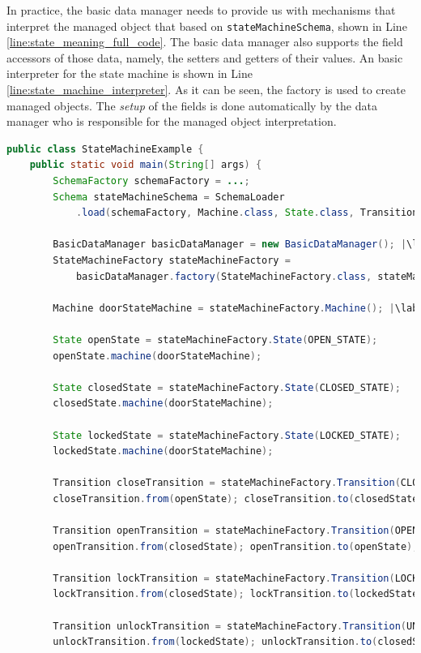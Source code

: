 In practice, the basic data manager needs to provide us with mechanisms that interpret the managed object that based on \texttt{stateMachineSchema}, shown in Line \ref{line:state_meaning_full_code}.
The basic data manager  also supports the field accessors of those data, namely, the setters and getters of their values.
An basic interpreter for the state machine is shown in Line \ref{line:state_machine_interpreter}.
As it can be seen, the factory is used to create managed objects.
The \textit{setup} of the fields is done automatically by the data manager who is responsible for the managed object interpretation.

\begin{sourcecode}
	\begin{lstlisting}[language=Java, escapechar=|]
public class StateMachineExample {
	public static void main(String[] args) {
		SchemaFactory schemaFactory = ...;
		Schema stateMachineSchema = SchemaLoader
			.load(schemaFactory, Machine.class, State.class, Transition.class); |\label{line:state_schemaMachineSchema}|

		BasicDataManager basicDataManager = new BasicDataManager(); |\label{line:state_meaning_full_code}|
		StateMachineFactory stateMachineFactory = 
			basicDataManager.factory(StateMachineFactory.class, stateMachineSchema);

		Machine doorStateMachine = stateMachineFactory.Machine(); |\label{line:state_machine_creation_basic}|

		State openState = stateMachineFactory.State(OPEN_STATE);
		openState.machine(doorStateMachine);

		State closedState = stateMachineFactory.State(CLOSED_STATE);
		closedState.machine(doorStateMachine);

		State lockedState = stateMachineFactory.State(LOCKED_STATE);
		lockedState.machine(doorStateMachine);

		Transition closeTransition = stateMachineFactory.Transition(CLOSE_TRANSITION);
		closeTransition.from(openState); closeTransition.to(closedState);

		Transition openTransition = stateMachineFactory.Transition(OPEN_TRANSITION);
		openTransition.from(closedState); openTransition.to(openState);

		Transition lockTransition = stateMachineFactory.Transition(LOCK_TRANSITION);
		lockTransition.from(closedState); lockTransition.to(lockedState);

		Transition unlockTransition = stateMachineFactory.Transition(UNLOCK_TRANSITION);
		unlockTransition.from(lockedState); unlockTransition.to(closedState);


\end{lstlisting}
\end{sourcecode}
